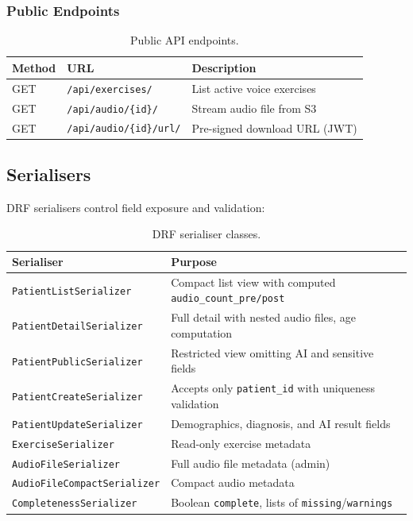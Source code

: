 \documentclass[12pt,a4paper]{article}
\begin{document}
\subsubsection{Public Endpoints}

\begin{table}[H]
\centering
\caption{Public API endpoints.}
\begin{tabularx}{\textwidth}{l l X}
\toprule
\textbf{Method} & \textbf{URL} & \textbf{Description} \\
\midrule
GET & \texttt{/api/exercises/}        & List active voice exercises \\
GET & \texttt{/api/audio/\{id\}/}     & Stream audio file from S3 \\
GET & \texttt{/api/audio/\{id\}/url/} & Pre-signed download URL (JWT) \\
\bottomrule
\end{tabularx}
\end{table}

\subsection{Serialisers}

DRF serialisers control field exposure and validation:

\begin{table}[H]
\centering
\caption{DRF serialiser classes.}
\label{tab:serialisers}
\begin{tabularx}{\textwidth}{l X}
\toprule
\textbf{Serialiser} & \textbf{Purpose} \\
\midrule
\texttt{PatientListSerializer}      & Compact list view with computed \texttt{audio\_count\_pre/post} \\
\texttt{PatientDetailSerializer}    & Full detail with nested audio files, age computation \\
\texttt{PatientPublicSerializer}    & Restricted view omitting AI and sensitive fields \\
\texttt{PatientCreateSerializer}    & Accepts only \texttt{patient\_id} with uniqueness validation \\
\texttt{PatientUpdateSerializer}    & Demographics, diagnosis, and AI result fields \\
\texttt{ExerciseSerializer}         & Read-only exercise metadata \\
\texttt{AudioFileSerializer}        & Full audio file metadata (admin) \\
\texttt{AudioFileCompactSerializer} & Compact audio metadata \\
\texttt{CompletenessSerializer}     & Boolean \texttt{complete}, lists of \texttt{missing}/\texttt{warnings} \\
\bottomrule
\end{tabularx}
\end{table}
\end{document}

